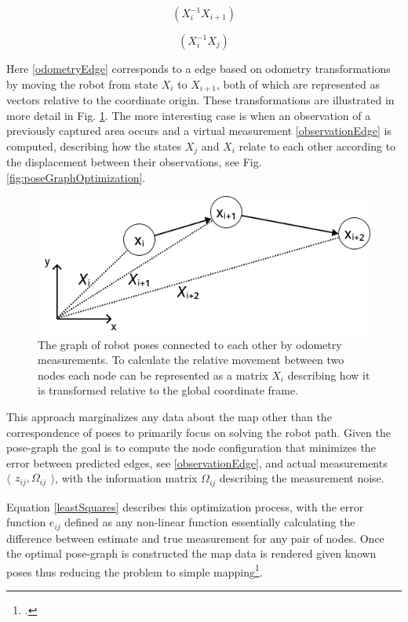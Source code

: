 \begin{equation}\label{odometryEdge}
	(X_{i}^{-1}X_{i+1})
\end{equation}

\begin{equation}\label{observationEdge}
	(X_{i}^{-1}X_{j})
\end{equation}

Here \ref{odometryEdge} corresponds to a edge based on odometry transformations by moving the robot from state $X_{i}$ to $X_{i+1}$, both of which are represented as vectors relative to the coordinate origin.
These transformations are illustrated in more detail in Fig. \ref{fig:poseGraphTransformation}.
The more interesting case is when an observation of a previously captured area occurs and a virtual measurement \ref{observationEdge} is computed, describing how the states $X_{j}$ and $X_{i}$ relate to each other according to the displacement between their observations, see Fig. \ref{fig:poseGraphOptimization}.

\begin{figure}
	\centering
	\includegraphics[width=0.6\linewidth]{img/PoseGraphTransformation}
	\caption{
		The graph of robot poses connected to each other by odometry measurements. To calculate the relative movement between two nodes each node can be represented as a matrix $X_{i}$ describing how it is transformed relative to the global coordinate frame.
	}
	\label{fig:poseGraphTransformation}
\end{figure}



This approach marginalizes any data about the map other than the correspondence of poses to primarily focus on solving the robot path. 
Given the pose-graph the goal is to compute the node configuration that minimizes the error between predicted edges, see \ref{observationEdge}, and actual measurements 
$
\langle
\begin{matrix}
	z_{ij},  \Omega_{ij}
\end{matrix}
\rangle
$, with the information matrix $\Omega_{ij}$ describing the measurement noise.

Equation \ref{leastSquares} describes this optimization process, with the error function $e_{ij}$ defined as any non-linear function essentially calculating the difference between estimate and true measurement for any pair of nodes. 
Once the optimal pose-graph is constructed the map data is rendered given known poses thus reducing the problem to simple mapping\footcite{grisetti2010graphSLAM}.

